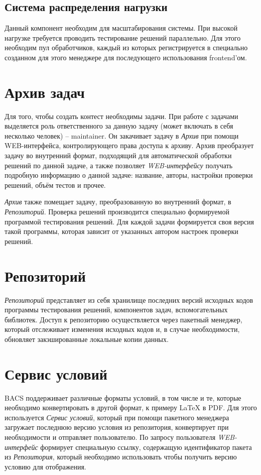 \subsection{Система распределения нагрузки}
Данный компонент необходим для масштабирования системы.
При высокой нагрузке требуется проводить тестирование решений параллельно.
Для этого необходим пул обработчиков, каждый из которых регистрируется в специально
созданном для этого менеджере для последующего использования frontend'ом.

\section{Архив задач}
Для того, чтобы создать контест необходимы задачи.
При работе с задачами выделяется роль ответственного за данную задачу (может включать в себя
несколько человек) -- maintainer. Он закачивает задачу в \textit{Архив} при помощи WEB-интерфейса,
контролирующего права доступа к архиву. Архив преобразует задачу во внутренний формат,
подходящий для автоматической обработки решений по данной задаче, а также позволяет
\textit{WEB-интерфейсу} получать подробную информацию о данной задаче:
название, авторы, настройки проверки решений, объём тестов и прочее.

\textit{Архив} также помещает задачу, преобразованную во внутренний формат, в \textit{Репозиторий}.
Проверка решений производится специально формируемой программой тестирования решений.
Для каждой задачи формируется своя версия такой программы, которая зависит
от указанных автором настроек проверки решений.

\section{Репозиторий}
\textit{Репозиторий} представляет из себя хранилище последних версий исходных кодов
программы тестирования решений, компонентов задач, вспомогательных библиотек.
Доступ к репозиторию осуществляется через пакетный менеджер,
который отслеживает изменения исходных кодов и, в случае необходимости,
обновляет закэшированные локальные копии данных.

\section{Сервис условий}
BACS поддерживает различные форматы условий, в том числе и те, которые необходимо
конвертировать в другой формат, к примеру LaTeX в PDF. Для этого используется
\textit{Сервис условий}, который при помощи пакетного менеджера загружает последнюю
версию условия из репозитория, конвертирует при необходимости
и отправляет пользователю. По запросу пользователя \textit{WEB-интерфейс}
формирует специальную ссылку, содержащую идентификатор пакета из \textit{Репозитория},
который необходимо использовать чтобы получить версию условию для отображения.

